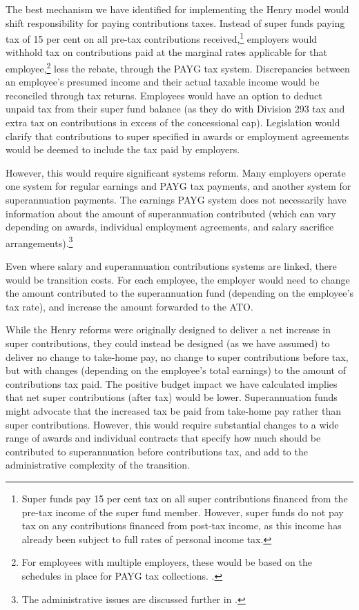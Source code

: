 The best mechanism we have identified for implementing the Henry model would shift responsibility for paying contributions taxes. Instead of super funds paying tax of 15 per cent on all pre-tax contributions received,\footnote{Super funds pay 15 per cent tax on all super contributions financed from the pre-tax income of the super fund member. However, super funds do not pay tax on any contributions financed from post-tax income, as this income has already been subject to full rates of personal income tax. }  employers would withhold tax on contributions paid at the marginal rates applicable for that employee,\footnote{For employees with multiple employers, these would be based on the schedules in place for PAYG tax collections. \textcite{ATO2015WhenYouHaveIncomeFromTwoPayers}.}  less the rebate, through the PAYG tax system. Discrepancies between an employee’s presumed income and their actual taxable income would be reconciled through tax returns. Employees would have an option to deduct unpaid tax from their super fund balance (as they do with Division 293 tax and extra tax on contributions in excess of the concessional cap). Legislation would clarify that contributions to super specified in awards or employment agreements would be deemed to include the tax paid by employers.

However, this would require significant systems reform. Many employers operate one system for regular earnings and PAYG tax payments, and another system for superannuation payments. The earnings PAYG system does not necessarily have information about the amount of superannuation contributed (which can vary depending on awards, individual employment agreements, and salary sacrifice arrangements).\footnote{The administrative issues are discussed further in \textcite{Mercer2015SubmissionToReThink}.} 

Even where salary and superannuation contributions systems are linked, there would be transition costs. For each employee, the employer would need to change the amount contributed to the superannuation fund (depending on the employee’s tax rate), and increase the amount forwarded to the ATO. 

While the Henry reforms were originally designed to deliver a net increase in super contributions, they could instead be designed (as we have assumed) to deliver no change to take-home pay, no change to super contributions before tax, but with changes (depending on the employee’s total earnings) to the amount of contributions tax paid. The positive budget impact we have calculated implies that net super contributions (after tax) would be lower. Superannuation funds might advocate that the increased tax be paid from take-home pay rather than super contributions. However, this would require substantial changes to a wide range of awards and individual contracts that specify how much should be contributed to superannuation before contributions tax, and add to the administrative complexity of the transition.

